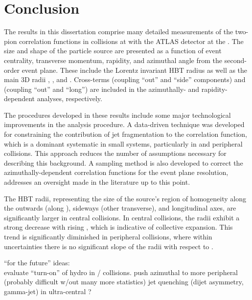\chapter{Conclusion}
\label{ch:conclusion}

The results in this dissertation comprise many detailed measurements of the two-pion correlation functions in \pPb collisions at \pPbenergy with the ATLAS detector at the \lhc.
The size and shape of the particle source are presented as a function of event centrality, transverse momentum, rapidity, and azimuthal angle from the second-order event plane.
These include the Lorentz invariant HBT radius \Rinv as well as the main 3D radii \Rout, \Rside, and \Rlong.
Cross-terms \Ros (coupling ``out'' and ``side'' components) and \Rol (coupling ``out'' and ``long'') are included in the azimuthally- and rapidity-dependent analyses, respectively.

The procedures developed in these results include some major technological improvements in the analysis procedure.
A data-driven technique was developed for constraining the contribution of jet fragmentation to the correlation function, which is a dominant systematic in small systems, particularly in \pp and peripheral \pA collisions.
This approach reduces the number of assumptions necessary for describing this background.
A sampling method is also developed to correct the azimuthally-dependent correlation functions for the event plane resolution, addresses an oversight made in the literature up to this point.

The HBT radii, representing the size of the source's region of homogeneity along the outwards (along \kt), sideways (other transverse), and longitudinal axes, are significantly larger in central collisions.
In central collisions, the radii exhibit a strong decrease with rising \kt, which is indicative of collective expansion.
This trend is significantly diminished in peripheral collisions, where within uncertainties there is no significant slope of the radii with respect to \kt.


``for the future'' ideas:\\
evaluate ``turn-on'' of hydro in \pPb / \pp collisions.
push azimuthal to more peripheral (probably difficult w/out many more statistics)
jet quenching (dijet asymmetry, gamma-jet) in ultra-central \pPb?
